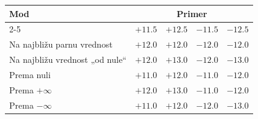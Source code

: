 \renewcommand{\arraystretch}{1.25}\setlength{\tabcolsep}{7pt}
\begin{tabular}{lrrrr}\toprule
\multirow{2}{*}{Mod}&\multicolumn{4}{c}{Primer}\\\cmidrule(lr){2-5}
&$+11.5$&$+12.5$&$-11.5$&$-12.5$\\\midrule
Na najbližu parnu vrednost&$+12.0$&$+12.0$&$-12.0$&$-12.0$\\
Na najbližu vrednost „od nule“&$+12.0$&$+13.0$&$-12.0$&$-13.0$\\
Prema nuli&$+11.0$&$+12.0$&$-11.0$&$-12.0$\\
Prema $+\infty$&$+12.0$&$+13.0$&$-11.0$&$-12.0$\\
Prema $-\infty$&$+11.0$&$+12.0$&$-12.0$&$-13.0$\\\bottomrule
\end{tabular}
